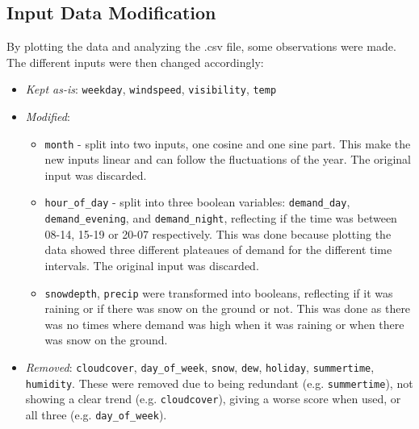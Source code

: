 \subsection{Input Data Modification}
By plotting the data and analyzing the .csv file, some observations were made. The different inputs were then changed accordingly:
\begin{itemize}
    \item \emph{Kept as-is}: \texttt{weekday}, \texttt{windspeed}, \texttt{visibility}, \texttt{temp}
    \item \emph{Modified}:
    \begin{itemize}
        \item \texttt{month} - split into two inputs, one cosine and one sine part. This make the new inputs linear and can follow the fluctuations of the year. The original input was discarded.
        \item \texttt{hour\_of\_day} - split into three boolean variables: \texttt{demand\_day}, \texttt{demand\_evening}, and \texttt{demand\_night}, reflecting if the time was between 08-14, 15-19 or 20-07 respectively. This was done because plotting the data showed three different plateaues of demand for the different time intervals. The original input was discarded.
        \item \texttt{snowdepth}, \texttt{precip} were transformed into booleans, reflecting if it was raining or if there was snow on the ground or not. This was done as there was no times where demand was high when it was raining or when there was snow on the ground.
    \end{itemize} 
    \item \emph{Removed}: \texttt{cloudcover}, \texttt{day\_of\_week}, \texttt{snow}, \texttt{dew}, \texttt{holiday}, \texttt{summertime}, \texttt{humidity}. These were removed due to being redundant (e.g. \texttt{summertime}), not showing a clear trend (e.g. \texttt{cloudcover}), giving a worse score when used, or all three (e.g. \texttt{day\_of\_week}).
\end{itemize}